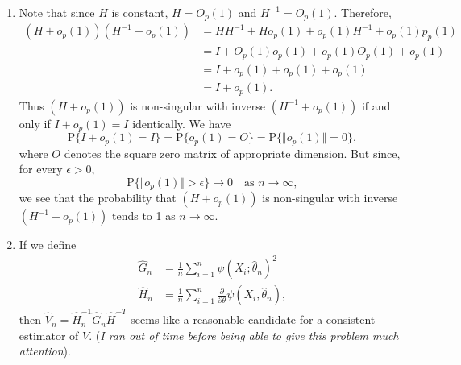 \documentclass[12pt]{article}
\newcommand{\Prob}{\mathrm{P}}
\begin{document}
\begin{enumerate}
\item
Note that since $H$ is constant, $H = O_p(1)$ and $H^{-1} = O_p(1)$. Therefore,
\begin{align*}
(H + o_p(1))(H^{-1} + o_p(1)) &= HH^{-1} + H o_p(1) + o_p(1) H^{-1} + o_p(1)p_p(1) \\
&= I + O_p(1)o_p(1) + o_p(1)O_p(1) + o_p(1) \\
&= I + o_p(1) + o_p(1) + o_p(1) \\
&= I + o_p(1).
\end{align*}
Thus $(H + o_p(1))$ is non-singular with inverse $(H^{-1} + o_p(1))$ if and only if $I + o_p(1) = I$ identically. We have
\begin{equation*}
\Prob\{I + o_p(1) = I\} = \Prob\{o_p(1) = O\} = \Prob\{\Vert o_p(1) \Vert = 0\},
\end{equation*}
where $O$ denotes the square zero matrix of appropriate dimension. But since, for every $\epsilon > 0$,
\begin{equation*}
\Prob\{\Vert o_p(1) \Vert > \epsilon\} \to 0 \quad \text{as $n \to \infty$},
\end{equation*}
we see that the probability that $(H + o_p(1))$ is non-singular with inverse $(H^{-1} + o_p(1))$ tends to 1 as $n \to \infty$.

\item
If we define
\begin{align*}
\hat{G}_n &= \frac{1}{n} \sum_{i=1}^n \psi(X_i; \hat{\theta}_n)^2 \\
\hat{H}_n &= \frac{1}{n} \sum_{i=1}^n \frac{\partial}{\partial \theta} \psi(X_i, \hat{\theta}_n),
\end{align*}
then $\hat{V}_n = \hat{H}_n^{-1} \hat{G}_n \hat{H}^{-T}$ seems like a reasonable candidate for a consistent estimator of $V$. (\textit{I ran out of time before being able to give this problem much attention}).


\end{enumerate}
\end{document}
